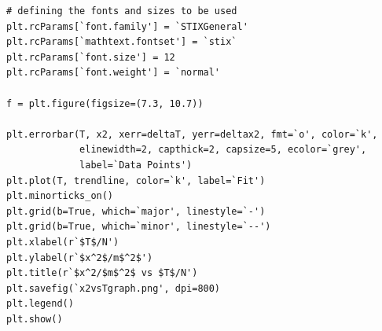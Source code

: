 \documentclass[12pt, a4paper]{article}
\begin{document}
\begin{verbatim}
# defining the fonts and sizes to be used
plt.rcParams[`font.family'] = `STIXGeneral'
plt.rcParams[`mathtext.fontset'] = `stix`
plt.rcParams[`font.size'] = 12
plt.rcParams[`font.weight'] = `normal'
 
f = plt.figure(figsize=(7.3, 10.7))
 
plt.errorbar(T, x2, xerr=deltaT, yerr=deltax2, fmt=`o', color=`k', 
             elinewidth=2, capthick=2, capsize=5, ecolor=`grey',
             label=`Data Points')
plt.plot(T, trendline, color=`k', label=`Fit')
plt.minorticks_on()
plt.grid(b=True, which=`major', linestyle=`-')
plt.grid(b=True, which=`minor', linestyle=`--')
plt.xlabel(r`$T$/N')
plt.ylabel(r`$x^2$/m$^2$')
plt.title(r`$x^2/$m$^2$ vs $T$/N')
plt.savefig(`x2vsTgraph.png', dpi=800)
plt.legend()
plt.show()
\end{verbatim}
\end{document}
